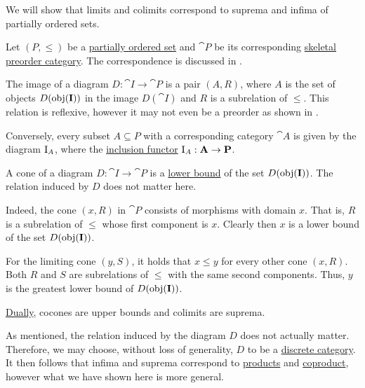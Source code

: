 \begin{example}\label{ex:limits_of_partially_ordered_set}
  We will show that limits and colimits correspond to suprema and infima of partially ordered sets.

  Let \( (P, \leq) \) be a \hyperref[def:partially_ordered_set]{partially ordered set} and \( \cat{P} \) be its corresponding \hyperref[def:skeletal_category]{skeletal} \hyperref[def:preorder_category]{preorder category}. The correspondence is discussed in .

  The image of a diagram \( D: \cat{I} \to \cat{P} \) is a pair \( (A, R) \), where \( A \) is the set of objects \( D(\operatorname{obj}(\operatorname{\mathbf{I}})) \) in the image \( D(\cat{I}) \) and \( R \) is a subrelation of \( \leq \). This relation is reflexive, however it may not even be a preorder as shown in .

  Conversely, every subset \( A \subseteq P \) with a corresponding category \( \cat{A} \) is given by the diagram \( \operatorname{I}_A \), where the \hyperref[def:subcategory]{inclusion functor} \( \operatorname{I}_A: \operatorname{\mathbf{A}} \to \operatorname{\mathbf{P}} \).

  A cone of a diagram \( D: \cat{I} \to \cat{P} \) is a \hyperref[def:extremal_points/upper_and_lower_bounds]{lower bound} of the set \( D(\operatorname{obj}(\operatorname{\mathbf{I}})) \). The relation induced by \( D \) does not matter here.

  Indeed, the cone \( (x, R) \) in \( \cat{P} \) consists of morphisms with domain \( x \). That is, \( R \) is a subrelation of \( \leq \) whose first component is \( x \). Clearly then \( x \) is a lower bound of the set \( D(\operatorname{obj}(\operatorname{\mathbf{I}})) \).

  For the limiting cone \( (y, S) \), it holds that \( x \leq y \) for every other cone \( (x, R) \). Both \( R \) and \( S \) are subrelations of \( \leq \) with the same second components. Thus, \( y \) is the greatest lower bound of \( D(\operatorname{obj}(\operatorname{\mathbf{I}})) \).

  \hyperref[thm:categorical_principle_of_duality]{Dually}, cocones are upper bounds and colimits are suprema.

  As mentioned, the relation induced by the diagram \( D \) does not actually matter. Therefore, we may choose, without loss of generality, \( D \) to be a \hyperref[def:discrete_category]{discrete category}. It then follows that infima and suprema correspond to \hyperref[def:discrete_category_limits]{products} and \hyperref[def:discrete_category_limits]{coproduct}, however what we have shown here is more general.
\end{example}

